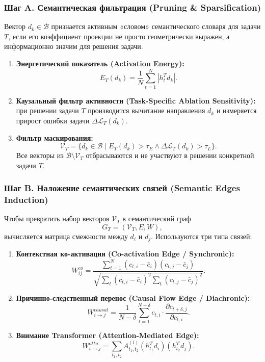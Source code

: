 \documentclass[11pt,a4paper]{article}
\begin{document}
\subsubsection*{Шаг A. Семантическая фильтрация (Pruning \& Sparsification)}

Вектор $d_k\in\mathcal{B}$ признается активным «словом» семантического словаря для задачи $T$, если его коэффициент проекции не просто геометрически выражен, а информационно значим для решения задачи.

\begin{enumerate}
    \item \textbf{Энергетический показатель (Activation Energy):}
    \[
    E_T(d_k)=\frac{1}{N}\sum_{t=1}^{N}|h_t^T d_k|.
    \]
    \item \textbf{Каузальный фильтр активности (Task-Specific Ablation Sensitivity):} при решении задачи $T$ производится вычитание направления $d_k$ и измеряется прирост ошибки задачи $\Delta\mathcal{L}_T(d_k)$.
    \item \textbf{Фильтр маскирования:}
    \[
    \mathcal{V}_T=
    \{d_k\in\mathcal{B}\mid E_T(d_k)>\tau_E
    \land
    \Delta\mathcal{L}_T(d_k)>\tau_L\}.
    \]
    Все векторы из $\mathcal{B}\setminus\mathcal{V}_T$ отбрасываются и не участвуют в решении конкретной задачи $T$.
\end{enumerate}

\subsubsection*{Шаг B. Наложение семантических связей (Semantic Edges Induction)}

Чтобы превратить набор векторов $\mathcal{V}_T$ в семантический граф
\[
G_T=(\mathcal{V}_T,E,W),
\]
вычисляется матрица смежности между $d_i$ и $d_j$. Используются три типа связей:

\begin{enumerate}
    \item \textbf{Контекстная ко-активация (Co-activation Edge / Synchronic):}
    \[
    W_{ij}^{co}
    =
    \frac{\sum_{t=1}^{N}(c_{t,i}-\bar c_i)(c_{t,j}-\bar c_j)}
    {\sqrt{\sum_t(c_{t,i}-\bar c_i)^2
    \sum_t(c_{t,j}-\bar c_j)^2}}.
    \]
    \item \textbf{Причинно-следственный перенос (Causal Flow Edge / Diachronic):}
    \[
    W_{i\rightarrow j}^{causal}
    =
    \frac{1}{N-\delta}
    \sum_{t=1}^{N-\delta}
    c_{t,i}\cdot
    \frac{\partial c_{t+\delta,j}}{\partial c_{t,i}}.
    \]
    \item \textbf{Внимание Transformer (Attention-Mediated Edge):}
    \[
    W_{i\rightarrow j}^{attn}
    =
    \sum_{t_1,t_2}
    A_{t_1,t_2}^{(l)}
    (h_{t_1}^Td_i)
    (h_{t_2}^Td_j).
    \]
\end{enumerate}
\end{document}

